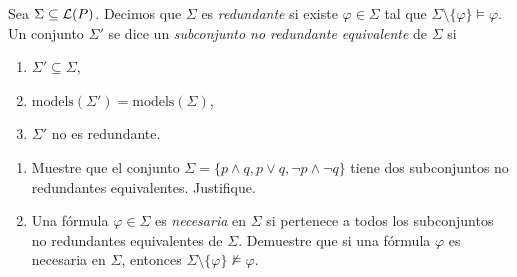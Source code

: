 
Sea $\Sigma\subseteq\mathcal{L}(P)$. Decimos que $\Sigma$ es \textit{redundante} si existe $\varphi\in\Sigma$ tal que $\Sigma\setminus\{\varphi\}\models\varphi$. Un conjunto $\Sigma'$ se dice un \textit{subconjunto no redundante equivalente} de $\Sigma$ si 
\begin{enumerate}
    \item $\Sigma'\subseteq\Sigma$,
    \item $\text{models}(\Sigma')=\text{models}(\Sigma)$,
    \item $\Sigma'$ no es redundante.
\end{enumerate}
\begin{enumerate}[label=(\alph*)]
    \item Muestre que el conjunto $\Sigma=\{p\wedge q,p\vee q, \neg p\wedge\neg q\}$ tiene dos subconjuntos no redundantes equivalentes. Justifique.
    \item Una fórmula $\varphi\in\Sigma$ es \textit{necesaria} en $\Sigma$ si pertenece a todos los subconjuntos no redundantes equivalentes de $\Sigma$. Demuestre que si una fórmula $\varphi$ es necesaria en $\Sigma$, entonces $\Sigma\setminus\{\varphi\}\not\models\varphi.$
\end{enumerate}

